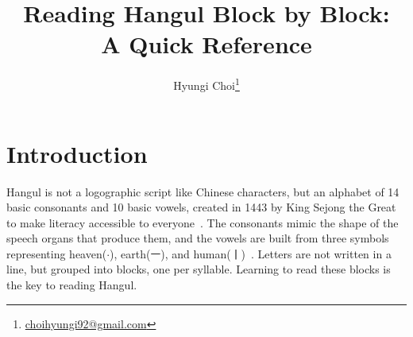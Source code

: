 \documentclass[9pt,a4paper,twocolumn,twoside]{tau-class/tau}
\title{Reading Hangul Block by Block:\\ A Quick Reference}
\author[a,1]{Hyungi Choi\thanks{\href{mailto:choihyungi92@gmail.com}{choihyungi92@gmail.com}}}
\begin{document}
    \maketitle
    \thispagestyle{firststyle}
    \tableofcontents

\section{Introduction}
    Hangul is not a logographic script like Chinese characters, but an alphabet of 14 basic consonants and 10 basic vowels, created in 1443 by King Sejong the Great to make literacy accessible to everyone~\cite{hunminjeongeum}. The consonants mimic the shape of the speech organs that produce them, and the vowels are built from three symbols representing heaven($\cdot$), earth(ㅡ), and human(ㅣ)~\cite{hunminjeongeum}. Letters are not written in a line, but grouped into blocks, one per syllable. Learning to read these blocks is the key to reading Hangul.
\newpage





\newpage

\printbibliography
\end{document}
